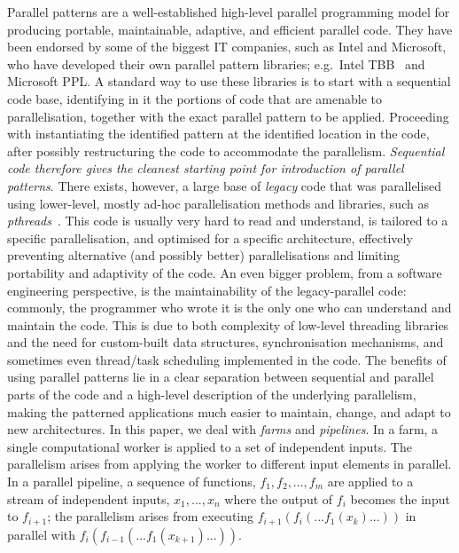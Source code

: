 Parallel patterns are a well-established high-level parallel programming model for producing portable, maintainable, adaptive, and efficient parallel code. They have been endorsed by some of the biggest IT companies, such as Intel and Microsoft, who have developed their own parallel pattern libraries; e.g.\ Intel TBB~\cite{DBLP:reference/parallel/X11pz} and Microsoft PPL. A standard way to use these libraries is to start with a sequential code base, identifying in it the portions of code that are amenable to parallelisation, together with the exact parallel pattern to be applied.  Proceeding with instantiating the identified pattern at the identified location in the code, after possibly restructuring the code to accommodate the parallelism. 
\emph{Sequential code therefore gives the cleanest starting point for introduction of parallel patterns}. There exists, however, a large base of \emph{legacy} code  that was parallelised using lower-level, mostly ad-hoc parallelisation methods and libraries, such as \emph{pthreads}~\cite{10.5555/263953}. This code is usually very hard to read and understand, is tailored to a specific parallelisation, and optimised for a specific architecture, effectively preventing alternative (and possibly better) parallelisations and limiting portability and adaptivity of the code. An even bigger problem, from a software engineering perspective, is the maintainability of the legacy-parallel code: commonly, the programmer who wrote it is the only one who can understand and maintain the code. This is due to both complexity of low-level threading libraries and the need for custom-built data structures, synchronisation mechanisms, and sometimes even thread/task scheduling implemented in the code. 
%
The benefits of using parallel patterns lie in a clear separation between sequential and parallel parts of the code and a high-level description of the underlying parallelism, making the patterned applications much easier to maintain, change, and adapt to new architectures. In this paper, we deal with \emph{farms} and \emph{pipelines}.
%
In a farm, a single computational worker is applied to a set of independent inputs. The parallelism arises from applying the worker to different input elements in parallel. 
In a parallel pipeline, a sequence of functions, $f_{1}, f_{2}, ..., f_{m}$ are applied to a stream of independent inputs, $x_{1}, ..., x_{n}$ where the output of $f_{i}$ becomes the input to $f_{i+1}$; the parallelism arises from executing $f_{i+1}(f_{i}(...f_{1}(x_{k})...))$ in parallel with $f_{i}(f_{i-1}(...f_{1}(x_{k+1})...))$.
